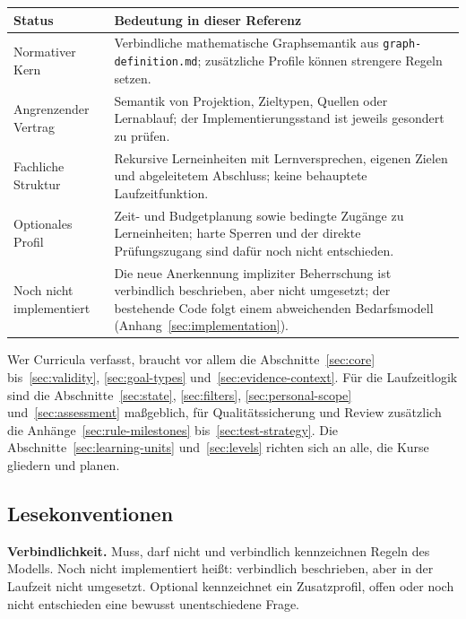 \documentclass[11pt,a4paper,parskip=half,headings=normal,numbers=noenddot]{scrartcl}
\newcommand{\code}[1]{\texttt{#1}}
\begin{document}
\begin{center}\small
\begin{tabularx}{\linewidth}{@{}P{35mm}X@{}}
\toprule
Status & Bedeutung in dieser Referenz \\
\midrule
Normativer Kern & Verbindliche mathematische Graphsemantik aus
\code{graph-definition.md}; zusätzliche Profile können strengere Regeln setzen.\\
Angrenzender Vertrag & Semantik von Projektion, Zieltypen, Quellen oder
Lernablauf; der Implementierungsstand ist jeweils gesondert zu prüfen.\\
Fachliche Struktur & Rekursive Lerneinheiten mit Lernversprechen,
eigenen Zielen und abgeleitetem Abschluss; keine behauptete Laufzeitfunktion.\\
Optionales Profil & Zeit- und Budgetplanung sowie bedingte Zugänge zu
Lerneinheiten; harte Sperren und der direkte Prüfungszugang sind dafür noch
nicht entschieden.\\
Noch nicht implementiert & Die neue Anerkennung impliziter Beherrschung ist
verbindlich beschrieben, aber nicht umgesetzt; der bestehende Code folgt
einem abweichenden Bedarfsmodell (Anhang~\ref{sec:implementation}).\\
\bottomrule
\end{tabularx}\end{center}

Wer Curricula verfasst, braucht vor allem die
Abschnitte~\ref{sec:core} bis~\ref{sec:validity}, \ref{sec:goal-types}
und~\ref{sec:evidence-context}. Für die Laufzeitlogik sind die
Abschnitte~\ref{sec:state}, \ref{sec:filters}, \ref{sec:personal-scope}
und~\ref{sec:assessment} maßgeblich, für Qualitätssicherung und Review
zusätzlich die Anhänge~\ref{sec:rule-milestones}
bis~\ref{sec:test-strategy}. Die Abschnitte~\ref{sec:learning-units}
und~\ref{sec:levels} richten sich an alle, die Kurse gliedern und planen.

\subsection*{Lesekonventionen}
\textbf{Verbindlichkeit.} \glqq Muss\grqq, \glqq darf nicht\grqq{} und
\glqq verbindlich\grqq{} kennzeichnen Regeln des Modells.
\glqq Noch nicht implementiert\grqq{} heißt: verbindlich beschrieben, aber
in der Laufzeit nicht umgesetzt. \glqq Optional\grqq{} kennzeichnet ein
Zusatzprofil, \glqq offen\grqq{} oder \glqq noch nicht entschieden\grqq{}
eine bewusst unentschiedene Frage.
\end{document}
